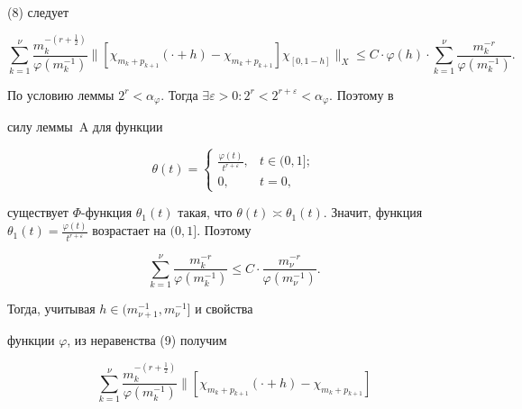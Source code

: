 \begin{pf}
(8) следует


\begin{equation}


\sum_{k=1}^{\nu} \frac{m_{k}^{-(r+\frac{1}{2})}}{ 


\varphi(m_{k}^{-1})}\|[\chi_{m_{k}+p_{k+1}}(\cdot+h)-\chi_{m_{k}+p_{k+1}}]  


\chi_{[0,1-h]} \|_{X}\leq C\cdot \varphi(h)\cdot\sum_{k=1}^{\nu}


\frac{m_{k}^{-r}}{\varphi(m_{k}^{-1})}. 


\end{equation}


По условию леммы $2^{r}<\alpha_{\varphi}$. Тогда $\exists 


\varepsilon>0:2^{r}<2^{r+\varepsilon}<\alpha_{\varphi}$. Поэтому в 


силу леммы~A для функции 


$$


\theta(t)=


\begin{cases}


\frac{\varphi(t)}{t^{r+\varepsilon}}, & t\in(0,1]; \\ 


0, & t=0,


\end{cases}


$$


существует $\Phi$-функция $\theta_{1}(t)$ такая, что $\theta(t)\asymp 


\theta_{1}(t)$. Значит, функция $\theta_{1}(t)=\frac{\varphi(t)}{t^{r+ 


\varepsilon}}$ возрастает на $(0,1]$. Поэтому


$$


\sum_{k=1}^{\nu}


\frac{m_{k}^{-r}}{\varphi(m_{k}^{-1})}\leq C\cdot 


\frac{m_{\nu}^{-r}}{\varphi(m_{\nu}^{-1})}.


$$


Тогда, учитывая $h\in (m_{\nu+1}^{-1}, m_{\nu}^{-1}]$ и свойства 


функции $\varphi$, из неравенства (9) получим


\begin{equation}


\sum_{k=1}^{\nu} \frac{m_{k}^{-(r+\frac{1}{2})}}{ 


\varphi(m_{k}^{-1})}\|[\chi_{m_{k}+p_{k+1}}(\cdot+h)-\chi_{m_{k}+p_{k+1}}]  



\end{equation}
\end{pf}
